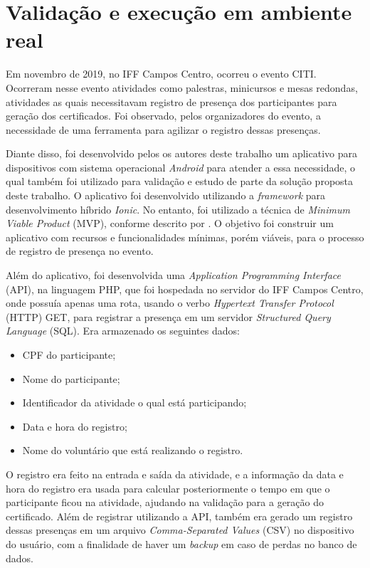 \section{Validação e execução em ambiente real}

Em novembro de 2019, no IFF Campos Centro, ocorreu o evento CITI. Ocorreram nesse evento atividades como palestras, minicursos e mesas redondas, atividades as quais necessitavam registro de presença dos participantes para geração dos certificados. Foi observado, pelos organizadores do evento, a necessidade de uma ferramenta para agilizar o registro dessas presenças. 

Diante disso, foi desenvolvido pelos os autores deste trabalho um aplicativo para dispositivos com sistema operacional \textit{Android} para atender a essa necessidade, o qual também foi utilizado para validação e estudo de parte da solução proposta deste trabalho. O aplicativo foi desenvolvido utilizando a \textit{framework} para desenvolvimento híbrido \textit{Ionic}. No entanto, foi utilizado a técnica de \textit{Minimum Viable Product} (MVP), conforme descrito por . O objetivo foi construir um aplicativo com recursos e funcionalidades mínimas, porém viáveis, para o processo de registro de presença no evento.

Além do aplicativo, foi desenvolvida uma \textit{Application Programming Interface} (API), na linguagem PHP, que foi hospedada no servidor do IFF Campos Centro, onde possuía apenas uma rota, usando o verbo \textit{Hypertext Transfer Protocol} (HTTP) GET, para registrar a presença em um servidor \textit{Structured Query Language} (SQL). Era armazenado os seguintes dados:

\begin{itemize}
    \item CPF do participante;
    \item Nome do participante;
    \item Identificador da atividade o qual está participando;
    \item Data e hora do registro;
    \item Nome do voluntário que está realizando o registro.
\end{itemize}

O registro era feito na entrada e saída da atividade, e a informação da data e hora do registro era usada para calcular posteriormente o tempo em que o participante ficou na atividade, ajudando na validação para a geração do certificado. Além de registrar utilizando a API, também era gerado um registro dessas presenças em um arquivo \textit{Comma-Separated Values} (CSV) no dispositivo do usuário, com a finalidade de haver um \textit{backup} em caso de perdas no banco de dados.


